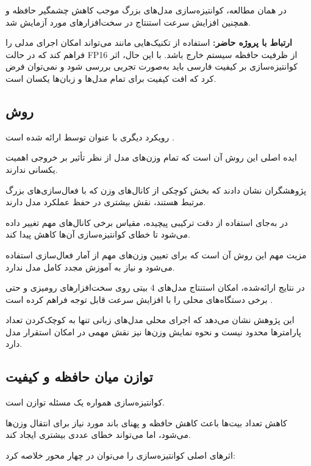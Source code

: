 در همان مطالعه، کوانتیزه‌سازی مدل‌های بزرگ موجب کاهش چشمگیر
حافظه و همچنین افزایش سرعت استنتاج در سخت‌افزارهای مورد
آزمایش شد.

\textbf{ارتباط با پروژه حاضر:}
استفاده از تکنیک‌هایی مانند  می‌تواند امکان اجرای مدلی
را فراهم کند که در حالت FP16 از ظرفیت حافظه سیستم خارج باشد.
با این حال، اثر کوانتیزه‌سازی بر کیفیت فارسی باید به‌صورت
تجربی بررسی شود و نمی‌توان فرض کرد که افت کیفیت برای تمام
مدل‌ها و زبان‌ها یکسان است.


\subsection{روش }

رویکرد دیگری با عنوان
توسط
ارائه شده است
\cite{lin2023awq}.

ایده اصلی این روش آن است که تمام وزن‌های مدل از نظر تأثیر
بر خروجی اهمیت یکسانی ندارند.

پژوهشگران نشان دادند که بخش کوچکی از کانال‌های وزن که با
فعال‌سازی‌های بزرگ مرتبط هستند، نقش بیشتری در حفظ عملکرد
مدل دارند.

در  به‌جای استفاده از دقت ترکیبی پیچیده، مقیاس برخی
کانال‌های مهم تغییر داده می‌شود تا خطای کوانتیزه‌سازی آن‌ها
کاهش پیدا کند.

مزیت مهم این روش آن است که برای تعیین وزن‌های مهم از
آمار فعال‌سازی استفاده می‌شود و نیاز به آموزش مجدد کامل
مدل ندارد.

در نتایج ارائه‌شده،  امکان استنتاج مدل‌های 4 بیتی روی
سخت‌افزارهای رومیزی و حتی برخی دستگاه‌های محلی را با افزایش
سرعت قابل توجه فراهم کرده است
\cite{lin2023awq}.

این پژوهش نشان می‌دهد که اجرای محلی مدل‌های زبانی تنها به
کوچک‌کردن تعداد پارامترها محدود نیست و نحوه نمایش وزن‌ها نیز
نقش مهمی در امکان استقرار مدل دارد.


\subsection{توازن میان حافظه و کیفیت}

کوانتیزه‌سازی همواره یک مسئله توازن است.

کاهش تعداد بیت‌ها باعث کاهش حافظه و پهنای باند مورد نیاز
برای انتقال وزن‌ها می‌شود، اما می‌تواند خطای عددی بیشتری
ایجاد کند.

اثرهای اصلی کوانتیزه‌سازی را می‌توان در چهار محور خلاصه کرد:

